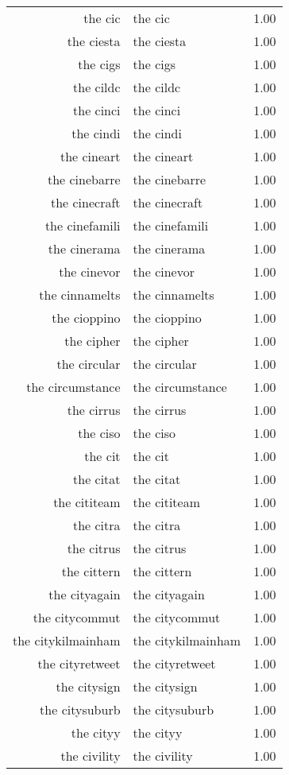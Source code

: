 \begin{table}[ht]
\begin{tabular}{rlr}
  the cic & the cic & 1.00 \\ 
  the ciesta & the ciesta & 1.00 \\ 
  the cigs & the cigs & 1.00 \\ 
  the cildc & the cildc & 1.00 \\ 
  the cinci & the cinci & 1.00 \\ 
  the cindi & the cindi & 1.00 \\ 
  the cineart & the cineart & 1.00 \\ 
  the cinebarre & the cinebarre & 1.00 \\ 
  the cinecraft & the cinecraft & 1.00 \\ 
  the cinefamili & the cinefamili & 1.00 \\ 
  the cinerama & the cinerama & 1.00 \\ 
  the cinevor & the cinevor & 1.00 \\ 
  the cinnamelts & the cinnamelts & 1.00 \\ 
  the cioppino & the cioppino & 1.00 \\ 
  the cipher & the cipher & 1.00 \\ 
  the circular & the circular & 1.00 \\ 
  the circumstance & the circumstance & 1.00 \\ 
  the cirrus & the cirrus & 1.00 \\ 
  the ciso & the ciso & 1.00 \\ 
  the cit & the cit & 1.00 \\ 
  the citat & the citat & 1.00 \\ 
  the cititeam & the cititeam & 1.00 \\ 
  the citra & the citra & 1.00 \\ 
  the citrus & the citrus & 1.00 \\ 
  the cittern & the cittern & 1.00 \\ 
  the cityagain & the cityagain & 1.00 \\ 
  the citycommut & the citycommut & 1.00 \\ 
  the citykilmainham & the citykilmainham & 1.00 \\ 
  the cityretweet & the cityretweet & 1.00 \\ 
  the citysign & the citysign & 1.00 \\ 
  the citysuburb & the citysuburb & 1.00 \\ 
  the cityy & the cityy & 1.00 \\ 
  the civility & the civility & 1.00 \\ 

\end{tabular}
\end{table}
